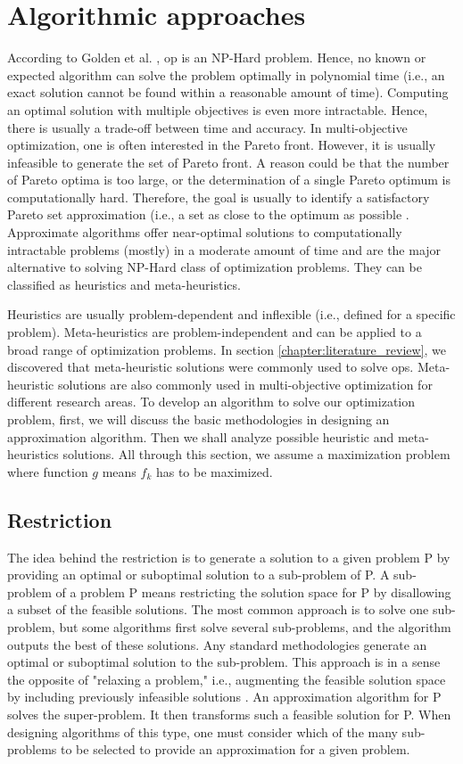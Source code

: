 \section{Algorithmic approaches}
According to Golden et al. \parencite{Golden1987TheProblem}, \gls{op} is an NP-Hard problem. Hence, no known or expected algorithm can solve the problem optimally in polynomial time (i.e., an exact solution cannot be found within a reasonable amount of time). Computing an optimal solution with multiple objectives is even more intractable. Hence, there is usually a trade-off between time and accuracy. In multi-objective optimization, one is often interested in the Pareto front. However, it is usually infeasible to generate the set of Pareto front. A reason could be that the number of Pareto optima is too large, or the determination of a single Pareto optimum is computationally hard. Therefore, the goal is usually to identify a satisfactory Pareto set approximation (i.e., a set as close to the optimum as possible \parencite{Fonseca2005AOptimizers}. Approximate algorithms offer near-optimal solutions to computationally intractable problems (mostly) in a moderate amount of time and are the major alternative to solving NP-Hard class of optimization problems. They can be classified as heuristics and meta-heuristics. 

Heuristics are usually problem-dependent and inflexible (i.e., defined for a specific problem). Meta-heuristics are problem-independent and can be applied to a broad range of optimization problems. In section \ref{chapter:literature_review}, we discovered that meta-heuristic solutions were commonly used to solve \glspl{op}. Meta-heuristic solutions are also commonly used in multi-objective optimization for different research areas. To develop an algorithm to solve our optimization problem, first, we will discuss the basic methodologies in designing an approximation algorithm. Then we shall analyze possible heuristic and meta-heuristics solutions. All through this section, we assume a maximization problem where function $g$ means $f_k$ has to be maximized.   

\subsection{Restriction}
The idea behind the restriction is to generate a solution to a given problem P by providing an optimal or suboptimal solution to a sub-problem of P. A sub-problem of a problem P means restricting the solution space for P by disallowing a subset of the feasible solutions. The most common approach is to solve one sub-problem, but some algorithms first solve several sub-problems, and the algorithm outputs the best of these solutions. Any standard methodologies generate an optimal or suboptimal solution to the sub-problem. This approach is in a sense the opposite of "relaxing a problem," i.e., augmenting the feasible solution space by including previously infeasible solutions \parencite{Gonzalez2007HandbookMetaheuristics}. An approximation algorithm for P solves the super-problem. It then transforms such a feasible solution for P. When designing algorithms of this type, one must consider which of the many sub-problems to be selected to provide an approximation for a given problem.


